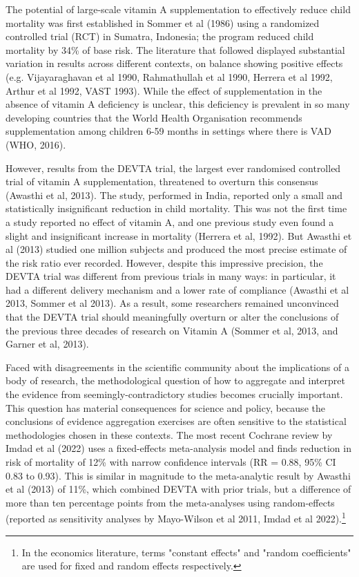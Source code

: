 \documentclass[12pt]{article}
\begin{document}
The potential of large-scale vitamin A supplementation to effectively reduce child mortality was first established in Sommer et al (1986) using a randomized controlled trial (RCT) in Sumatra, Indonesia; the program reduced child mortality by 34\% of base risk. The literature that followed displayed substantial variation in results across different contexts, on balance showing positive effects (e.g. Vijayaraghavan et al 1990, Rahmathullah et al 1990, Herrera et al 1992, Arthur et al 1992, VAST 1993). While the effect of supplementation in the absence of vitamin A deficiency is unclear, this deficiency is prevalent in so many developing countries that the World Health Organisation recommends supplementation among children 6-59 months in settings where there is VAD (WHO, 2016). 

However, results from the DEVTA trial, the largest ever randomised controlled trial
of vitamin A supplementation, threatened to overturn this consensus (Awasthi et al, 2013). 
The study, performed in India, reported only a small and statistically insignificant 
reduction in child mortality. This was not the first time a study reported no effect 
of vitamin A, and one previous study even found a slight and insignificant increase 
in mortality (Herrera et al, 1992). But Awasthi et al (2013) studied one million  
subjects and produced the most precise estimate 
of the risk ratio ever recorded. However, despite this impressive precision, the 
DEVTA trial was different from previous trials in many ways: in particular, it had a different delivery 
mechanism and a lower rate of compliance
(Awasthi et al 2013, Sommer et al 2013). As a result, some researchers remained unconvinced 
that the DEVTA trial should meaningfully overturn or alter the conclusions of the 
previous three decades of research on Vitamin A (Sommer et al, 2013, and Garner et al, 2013).

Faced with disagreements in the scientific community about the implications 
of a body of research, the methodological question of how to aggregate and interpret 
the evidence from seemingly-contradictory studies becomes crucially important. 
This question has material consequences for science and policy, because the conclusions 
of evidence aggregation exercises are often sensitive to the statistical methodologies 
chosen in these contexts. The most recent Cochrane review by Imdad et al (2022) uses a fixed-effects meta-analysis model and finds reduction in risk of mortality of 12\% with narrow confidence intervals (RR = 0.88, 95\% CI 0.83 to 0.93). This is similar in magnitude to the meta-analytic result by Awasthi et al (2013) of 11\%, which combined DEVTA with prior trials, but a difference of more than ten percentage points from the meta-analyses using random-effects (reported as sensitivity analyses by Mayo-Wilson et al 2011, Imdad et al 2022).\footnote{In the economics literature, terms "constant effects" and "random coefficients" are used for fixed and random effects respectively.} 
\end{document}
